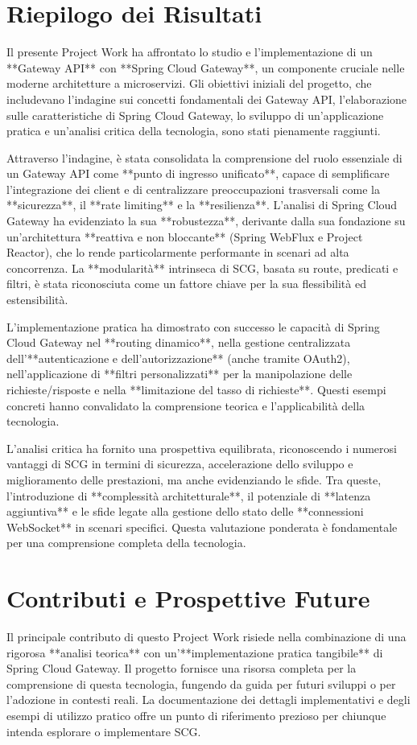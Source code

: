 \section{Riepilogo dei Risultati}
Il presente Project Work ha affrontato lo studio e l'implementazione di un **Gateway API** con **Spring Cloud Gateway**, un componente cruciale nelle moderne architetture a microservizi. Gli obiettivi iniziali del progetto, che includevano l'indagine sui concetti fondamentali dei Gateway API, l'elaborazione sulle caratteristiche di Spring Cloud Gateway, lo sviluppo di un'applicazione pratica e un'analisi critica della tecnologia, sono stati pienamente raggiunti.

Attraverso l'indagine, è stata consolidata la comprensione del ruolo essenziale di un Gateway API come **punto di ingresso unificato**, capace di semplificare l'integrazione dei client e di centralizzare preoccupazioni trasversali come la **sicurezza**, il **rate limiting** e la **resilienza**. L'analisi di Spring Cloud Gateway ha evidenziato la sua **robustezza**, derivante dalla sua fondazione su un'architettura **reattiva e non bloccante** (Spring WebFlux e Project Reactor), che lo rende particolarmente performante in scenari ad alta concorrenza. La **modularità** intrinseca di SCG, basata su route, predicati e filtri, è stata riconosciuta come un fattore chiave per la sua flessibilità ed estensibilità.

L'implementazione pratica ha dimostrato con successo le capacità di Spring Cloud Gateway nel **routing dinamico**, nella gestione centralizzata dell'**autenticazione e dell'autorizzazione** (anche tramite OAuth2), nell'applicazione di **filtri personalizzati** per la manipolazione delle richieste/risposte e nella **limitazione del tasso di richieste**. Questi esempi concreti hanno convalidato la comprensione teorica e l'applicabilità della tecnologia.

L'analisi critica ha fornito una prospettiva equilibrata, riconoscendo i numerosi vantaggi di SCG in termini di sicurezza, accelerazione dello sviluppo e miglioramento delle prestazioni, ma anche evidenziando le sfide. Tra queste, l'introduzione di **complessità architetturale**, il potenziale di **latenza aggiuntiva** e le sfide legate alla gestione dello stato delle **connessioni WebSocket** in scenari specifici. Questa valutazione ponderata è fondamentale per una comprensione completa della tecnologia.

\section{Contributi e Prospettive Future}
Il principale contributo di questo Project Work risiede nella combinazione di una rigorosa **analisi teorica** con un'**implementazione pratica tangibile** di Spring Cloud Gateway. Il progetto fornisce una risorsa completa per la comprensione di questa tecnologia, fungendo da guida per futuri sviluppi o per l'adozione in contesti reali. La documentazione dei dettagli implementativi e degli esempi di utilizzo pratico offre un punto di riferimento prezioso per chiunque intenda esplorare o implementare SCG.

